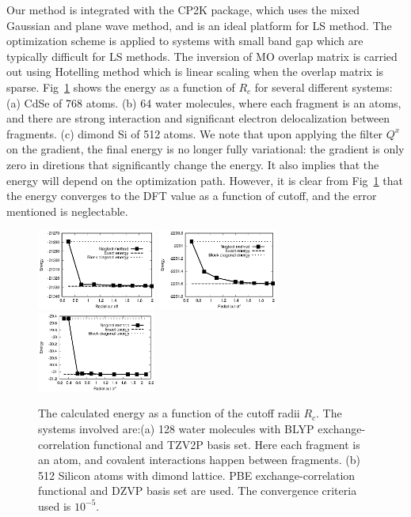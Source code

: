 \documentclass[aps,prl,twocolumn,reprint,amsmath,amssymb]{revtex4-1}
\begin{document}
\label{marker:results}
Our method is integrated with the CP2K package\cite{cp2kgeneral}, which uses the mixed Gaussian and plane wave method\cite{vandevondele2005quickstep}, and is an ideal platform for LS method. The optimization scheme is applied to systems with small band gap which are typically difficult for LS methods. The inversion of MO overlap matrix is carried out using Hotelling method \cite{hotelling1943some} which is linear scaling when the overlap matrix is sparse. Fig~\ref{fig:accuracy} shows the energy as a function of $R_c$ for several different systems: (a) CdSe of 768 atoms. (b) 64 water molecules, where each fragment is an atoms, and there are strong interaction and significant electron delocalization between fragments. (c) dimond Si of 512 atoms. We note that upon applying the filter $Q^x$ on the gradient, the final energy is no longer fully variational: the gradient is only zero in diretions that significantly change the energy. It also implies that the energy will depend on the optimization path. However, it is clear from Fig~\ref{fig:accuracy} that the energy converges to the DFT value as a function of cutoff, and the error mentioned is neglectable. 

\begin{figure}
\includegraphics[width=0.35\textwidth]{CdSe}
\includegraphics[width=0.35\textwidth]{H2O}
\includegraphics[width=0.35\textwidth]{Si}
\caption{The calculated energy as a function of the cutoff radii $R_c$. The systems involved are:(a) 128 water molecules with BLYP exchange-correlation functional and TZV2P basis set. Here each fragment is an atom, and covalent interactions happen between fragments. (b) 512 Silicon atoms with dimond lattice. PBE exchange-correlation functional and DZVP basis set are used. The convergence criteria used is $10^{-5}$.}
\label{fig:accuracy}
\end{figure}
\end{document}
